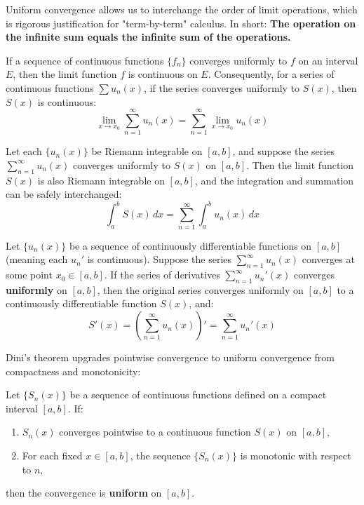 Uniform convergence allows us to interchange the order of limit operations, which is rigorous justification for "term-by-term" calculus. In short: \textbf{The operation on the infinite sum equals the infinite sum of the operations.}

\begin{theorem}[Continuity]
If a sequence of continuous functions $\{f_n\}$ converges uniformly to $f$ on an interval $E$, then the limit function $f$ is continuous on $E$.
Consequently, for a series of continuous functions $\sum u_n(x)$, if the series converges uniformly to $S(x)$, then $S(x)$ is continuous:
\[ \lim_{x \to x_0} \sum_{n=1}^{\infty} u_n(x) = \sum_{n=1}^{\infty} \lim_{x \to x_0} u_n(x) \]
\end{theorem}


\begin{theorem}
Let each $\{u_n(x)\}$ be Riemann integrable on $[a, b]$, and suppose the series $\sum_{n=1}^{\infty} u_n(x)$ converges uniformly to $S(x)$ on $[a, b]$. Then the limit function $S(x)$ is also Riemann integrable on $[a, b]$, and the integration and summation can be safely interchanged:
\[ \int_a^b S(x) \, dx = \sum_{n=1}^{\infty} \int_a^b u_n(x) \, dx \]
\end{theorem}

\begin{theorem}
Let $\{u_n(x)\}$ be a sequence of continuously differentiable functions on $[a, b]$ (meaning each $u_n'$ is continuous). Suppose the series $\sum_{n=1}^{\infty} u_n(x)$ converges at some point $x_0 \in [a, b]$. If the series of derivatives $\sum_{n=1}^{\infty} u_n'(x)$ converges \textbf{uniformly} on $[a, b]$, then the original series converges uniformly on $[a, b]$ to a continuously differentiable function $S(x)$, and:
\[ S'(x) = \left( \sum_{n=1}^{\infty} u_n(x) \right)' = \sum_{n=1}^{\infty} u_n'(x) \]
\end{theorem}

Dini's theorem upgrades pointwise convergence to uniform convergence from compactness and monotonicity:

\begin{theorem}
Let $\{S_n(x)\}$ be a sequence of continuous functions defined on a compact interval $[a, b]$. If:
\begin{enumerate}
    \item $S_n(x)$ converges pointwise to a continuous function $S(x)$ on $[a, b]$,
    \item For each fixed $x \in [a, b]$, the sequence $\{S_n(x)\}$ is monotonic with respect to $n$,
\end{enumerate}
then the convergence is \textbf{uniform} on $[a, b]$.
\end{theorem}

